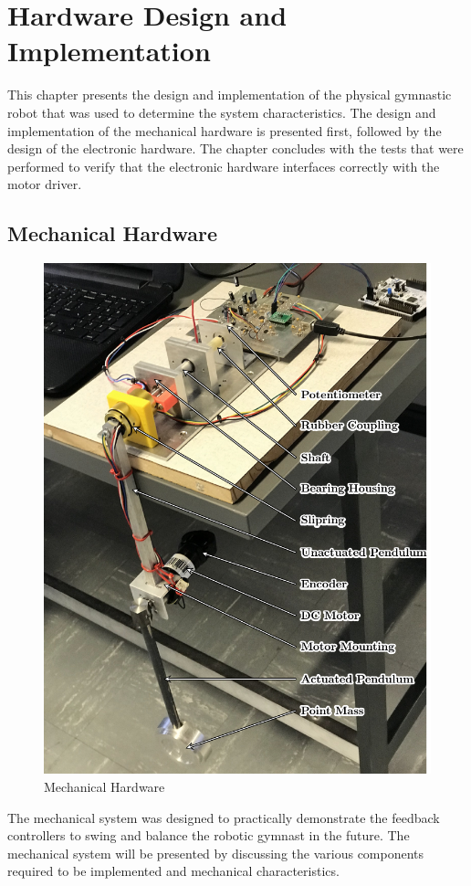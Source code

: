 \chapter{Hardware Design and Implementation}
This chapter presents the design and implementation of the physical gymnastic robot that was used to determine the system characteristics. The design and implementation of the mechanical hardware is presented first, followed by the design of the electronic hardware. The chapter concludes with the tests that were performed to verify that the electronic hardware interfaces correctly with the motor driver.

\section{Mechanical Hardware}
\label{sec:mechanical_hardware}

\begin{figure}[h]
	\centering
	\includegraphics{./figs/mech_layout/mech_layout.pdf}
	\caption{Mechanical Hardware}
	\label{fig:mech_layout}
\end{figure}
The mechanical system was designed to practically demonstrate the feedback controllers to swing and balance the robotic gymnast in the future. The mechanical system will be presented by discussing the various components required to be implemented and mechanical characteristics.\\

